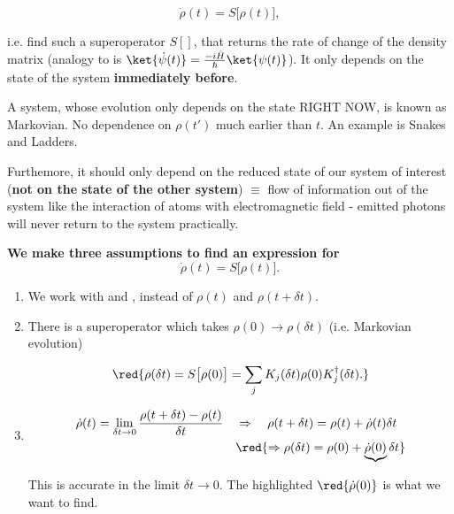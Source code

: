 \begin{equation}
\label{eqn:openDesire}
\dot{\rho}(t) = S\big[\rho(t)\big],
\end{equation}

\noindent i.e. find such a superoperator $S[]$, that returns the rate of change of the density matrix (analogy to \schrodinger is $\ket{\dot{\psi}(t)} = \frac{-i\hat{H}}{\hbar}\ket{\psi(t)}$). It only depends on the state of the system \textbf{immediately before}. 

{\Large A system, whose evolution only depends on the state RIGHT NOW, is known as Markovian. No dependence on $\rho(t')$ much earlier than $t$. An example is Snakes and Ladders.}

Furthemore, it should only depend on the reduced state of our system of interest (\textbf{not on the state of the other system}) $\equiv$ flow of information out of the system like the interaction of atoms with electromagnetic field - emitted photons will never return to the system practically.

\vspace{2ex}
\begin{center}
	\textbf{{\Large We make three assumptions to find an expression for
			\begin{equation}
			\dot{\rho}(t) = S\big[\rho(t)\big].
			\end{equation} }}
\end{center}

\begin{enumerate}
	\item We work with  and , instead of $\rho(t)$ and $\rho(t+\delta t)$.
	
	\item There is a superoperator which takes $\rho(0) \rightarrow \rho(\delta t)$ (i.e. Markovian evolution)
	
	\begin{equation}
	\red{\rho(\delta t) = S\big[\rho(0)\big] = \sum_jK_j(\delta t)\rho(0)K_j^\dagger(\delta t).}
	\label{eqn:openSuperoperator}
	\end{equation}
	
	\item 
	\begin{equation}
	\begin{aligned}
	\dot{\rho}(t) = \lim\limits_{\delta t\rightarrow0}\frac{\rho(t+\delta t)-\rho(t)}{\delta t} \quad & \Rightarrow \quad {\rho(t+\delta t) = \rho(t) + \dot{\rho}(t)\delta t}\\
	& \red{\Rightarrow\rho(\delta t) = \rho(0) + \underbrace{\dot{\rho}(0)}\delta t}
	\end{aligned}
	\label{eqn:openDerivatives}
	\end{equation}
	
	\noindent This is accurate in the limit $\delta t\rightarrow0$. The highlighted $\red{\dot{\rho}(0)}$ is what we want to find.
	
\end{enumerate}
\vspace{3ex}

